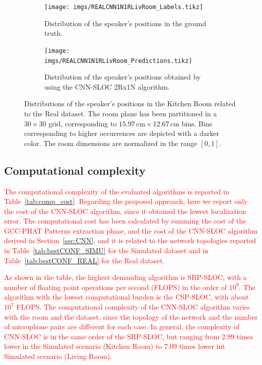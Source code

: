 \documentclass[review]{elsarticle}
\newcommand{\secref}[1]{Section~\ref{#1}}
\newcommand{\tableref}[1]{Table~\ref{#1}}
\begin{document}
\begin{figure}[t]
\centering
\begin{subfigure}[t]{0.45\textwidth}
\texttt{[image: imgs/REALCNN1N1RLivRoom\_Labels.tikz]}
\caption{Distribution of the speaker's positions in the ground truth.}\label{fig:distr_real_gt}
\end{subfigure}
\begin{subfigure}[t]{0.45\textwidth}
\texttt{[image: imgs/REALCNN1N1RLivRoom\_Predictions.tikz]}
\caption{Distribution of the speaker's positions obtained by using the CNN-SLOC 2Rx1N algorithm.}\label{fig:distr_real_pred}
\end{subfigure}
\caption{Distributions of the speaker's positions in the Kitchen Room related to the Real dataset. The room plane has been partitioned in a $30\times 30$ grid, corresponding to $15.97\,\text{cm} \times 12.67\,\text{cm}$ bins. Bins corresponding to higher occurrences are depicted with a darker color. The room dimensions are normalized in the range $[0,1]$.}\label{fig:distr_real}
\end{figure}


\subsection{Computational complexity}
\textcolor{red}{
The computational complexity of the evaluated algorithms is reported in \tableref{tab:comp_cost}. Regarding the proposed approach, here we report only the cost of the CNN-SLOC algorithm, since it obtained the lowest localization error. The computational cost has been calculated by summing the cost of the GCC-PHAT Patterns extraction phase, and the cost of the CNN-SLOC algorithm derived in \secref{sec:CNN}, and it is related to the network topologies reported in \tableref{tab:bestCONF_SIMU} for the Simulated dataset and in \tableref{tab:bestCONF_REAL} for the Real dataset.}

\textcolor{red}{
As shown in the table, the highest demanding algorithm is SRP-SLOC, with a number of floating point operations per second (FLOPS) in the order of $10^9$. The algorithm with the lowest computational burden is the CSP-SLOC, with about $10^7$ FLOPS. The computational complexity of the CNN-SLOC algorithm varies with the room and the dataset, since the topology of the network and the number of microphone pairs are different for each case. In general, the complexity of CNN-SLOC is in the same order of the SRP-SLOC, but ranging from $2.99$ times lower in the Simulated scenario (Kitchen Room) to $7.09$ times lower int Simulated scenario (Living Room).
}
\end{document}
